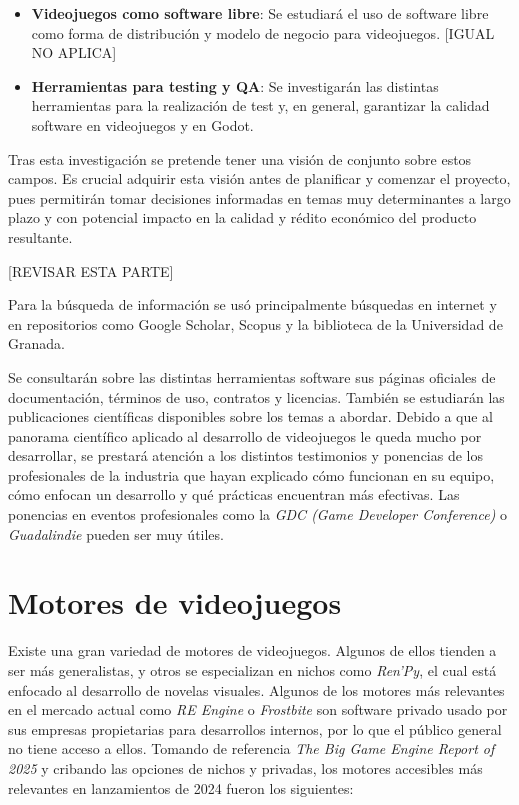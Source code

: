\begin{itemize}
    \item \textbf{Videojuegos como software libre}: Se estudiará el uso de software libre como forma de distribución y modelo de negocio para videojuegos. [IGUAL NO APLICA]
    
    \item \textbf{Herramientas para testing y QA}: Se investigarán las distintas herramientas para la realización de test y, en general, garantizar la calidad software en videojuegos y en Godot.

\end{itemize} 

Tras esta investigación se pretende tener una visión de conjunto sobre estos campos. Es crucial adquirir esta visión antes de planificar y comenzar el proyecto, pues permitirán tomar decisiones informadas en temas muy determinantes a largo plazo y con potencial impacto en la calidad y rédito económico del producto resultante.


[REVISAR ESTA PARTE]


Para la búsqueda de información se usó principalmente búsquedas en internet y en repositorios como Google Scholar, Scopus y la biblioteca de la Universidad de Granada.

Se consultarán sobre las distintas herramientas software sus páginas oficiales de documentación, términos de uso, contratos y licencias. También se estudiarán las publicaciones científicas disponibles sobre los temas a abordar. Debido a que al panorama científico aplicado al desarrollo de videojuegos le queda mucho por desarrollar, se prestará atención a los distintos testimonios y ponencias de los profesionales de la industria que hayan explicado cómo funcionan en su equipo, cómo enfocan un desarrollo y qué prácticas encuentran más efectivas. Las ponencias en eventos profesionales como la \textit{GDC (Game Developer Conference)} o \textit{Guadalindie} pueden ser muy útiles.

\section{Motores de videojuegos}

Existe una gran variedad de motores de videojuegos. Algunos de ellos tienden a ser más generalistas, y otros se especializan en nichos como \textit{Ren'Py}\cite{renpy}, el cual está enfocado al desarrollo de novelas visuales. Algunos de los motores más relevantes en el mercado actual como \textit{RE Engine} o \textit{Frostbite} son software privado usado por sus empresas propietarias para desarrollos internos, por lo que el público general no tiene acceso a ellos. Tomando de referencia \textit{The Big Game Engine Report of 2025}\cite{game-engine-report} y cribando las opciones de nichos y privadas, los motores accesibles más relevantes en lanzamientos de 2024 fueron los siguientes:


